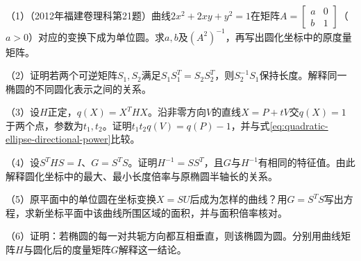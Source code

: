 \begin{exercise}
\mbox{}\par\nobreak

\begin{samepage}
（1）（2012年福建卷理科第21题）曲线\(2x^2+2xy+y^2=1\)在矩阵\(A=\left[\begin{smallmatrix}a&0\\b&1\end{smallmatrix}\right]\)（\(a>0\)）对应的变换下成为单位圆。求\(a,b\)及\((A^2)^{-1}\)，再写出圆化坐标中的原度量矩阵。
\par
\end{samepage}

\begin{samepage}
（2）证明若两个可逆矩阵\(S_1,S_2\)满足\(S_1S_1^T=S_2S_2^T\)，则\(S_2^{-1}S_1\)保持长度。解释同一椭圆的不同圆化表示之间的关系。
\par
\end{samepage}

\begin{samepage}
（3）设\(H\)正定，\(q(X)=X^THX\)。沿非零方向\(V\)的直线\(X=P+tV\)交\(q(X)=1\)于两个点，参数为\(t_1,t_2\)。证明\(t_1t_2q(V)=q(P)-1\)，并与式\eqref{eq:quadratic-ellipse-directional-power}比较。
\par
\end{samepage}
\begin{samepage}
（4）设\(S^THS=I\)、\(G=S^TS\)。证明\(H^{-1}=SS^T\)，且\(G\)与\(H^{-1}\)有相同的特征值。由此解释圆化坐标中的最大、最小长度倍率与原椭圆半轴长的关系。
\par
\end{samepage}

\begin{samepage}
（5）原平面中的单位圆在坐标变换\(X=SU\)后成为怎样的曲线？用\(G=S^TS\)写出方程，求新坐标平面中该曲线所围区域的面积，并与面积倍率核对。
\par
\end{samepage}

\begin{samepage}
（6）证明：若椭圆的每一对共轭方向都互相垂直，则该椭圆为圆。分别用曲线矩阵\(H\)与圆化后的度量矩阵\(G\)解释这一结论。
\par
\end{samepage}
\end{exercise}

